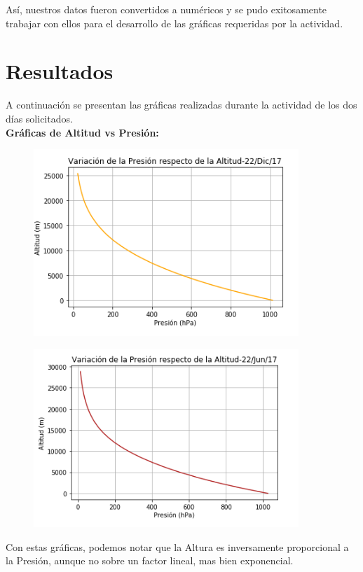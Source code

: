 \documentclass[a4paper]{article}
\begin{document}
Así, nuestros datos fueron convertidos a numéricos y se pudo exitosamente trabajar con ellos para el desarrollo de las gráficas requeridas por la actividad. 

\section {Resultados}

A continuación se presentan las gráficas realizadas durante la actividad de los dos días solicitados. \\

\textbf{Gráficas de Altitud vs Presión:}

\begin{figure}[h!]
  \includegraphics[width=10cm]{graf1.png}
  \centering
  \label{fig:5}
\end{figure}

\begin{figure}[h!]
  \includegraphics[width=10cm]{graf2.png}
  \centering
  \label{fig:6}
\end{figure}

Con estas gráficas, podemos notar que la Altura es inversamente proporcional a la Presión, aunque no sobre un factor lineal, mas bien exponencial.
\end{document}
